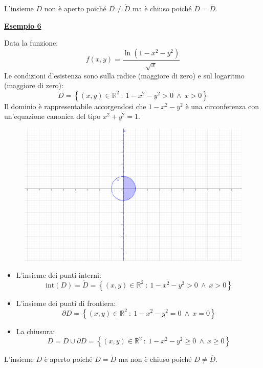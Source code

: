 \documentclass[a4paper]{article}
\newcommand{\example}[1]{\textcolor{Green4}{\textbf{#1}}}
\begin{document}
	L'insieme $D$ non è aperto poiché $D \ne \mathring{D}$ ma è chiuso poiché $D = \overline{D}$.\newpage

	\begin{flushleft}
		\example{\underline{Esempio 6}}
	\end{flushleft}

	\noindent
	Data la funzione:
	\begin{equation*}
		f\left(x,y\right) = \dfrac{\ln\left(1-x^{2}-y^{2}\right)}{\sqrt{x}}
	\end{equation*}
	Le condizioni d'esistenza sono sulla radice (maggiore di zero) e sul logaritmo (maggiore di zero):
	\begin{equation*}
		D = \left\{\left(x,y\right) \in \mathbb{R}^{2} \: : \: 1-x^{2}-y^{2} > 0 \: \land \: x > 0\right\}
	\end{equation*}
	Il dominio è rappresentabile accorgendosi che $1-x^{2}-y^{2}$ è una circonferenza con un'equazione canonica del tipo $x^{2} + y^{2} = 1$.
	\begin{figure}[!htp]
		\centering
		\includegraphics[width=.7\textwidth]{img/dominio_di_funzioni-6.pdf}
	\end{figure}
	\begin{itemize}
		\item L'insieme dei punti interni:
		\begin{equation*}
			\mathrm{int}\left(D\right) = \mathring{D} = \left\{\left(x,y\right) \in \mathbb{R}^{2} \: : \: 1-x^{2}-y^{2} > 0 \: \land \: x > 0\right\}
		\end{equation*}

		\item L'insieme dei punti di frontiera:
		\begin{equation*}
			\partial D = \left\{\left(x,y\right) \in \mathbb{R}^{2} \: : \: 1-x^{2}-y^{2} = 0 \: \land \: x = 0\right\}
		\end{equation*}

		\item La chiusura:
		\begin{equation*}
			\overline{D} = D \cup \partial D = \left\{\left(x,y\right) \in \mathbb{R}^{2} \: : \: 1-x^{2}-y^{2} \ge 0 \: \land \: x \ge 0\right\}
		\end{equation*}
	\end{itemize}
	L'insieme $D$ è aperto poiché $D = \mathring{D}$ ma non è chiuso poiché $D \ne \overline{D}$.\newpage
\end{document}

